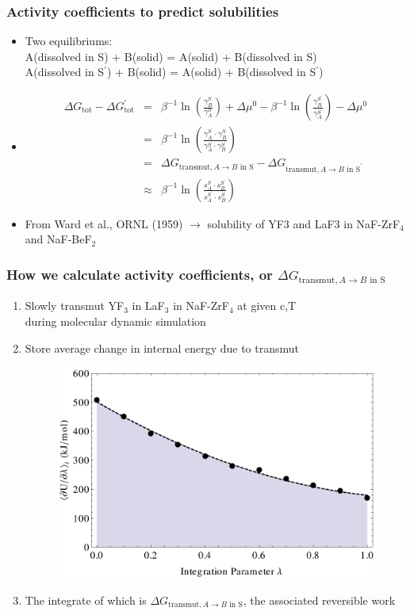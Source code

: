 \documentclass{beamer}
\begin{document}
\begin{frame}
    \frametitle{Activity coefficients to predict solubilities}
    \begin{itemize}
        \item Two equilibriums:\\
            A(dissolved in S) + B(solid) = A(solid) + B(dissolved in S)\\
            A(dissolved in S$^\prime$) + B(solid) = A(solid) + B(dissolved in S$^\prime$)
        \item
            \begin{eqnarray}
                \Delta G_\text{tot} - \Delta G_\text{tot}^\prime &=& \beta^{-1}\ln\left(\frac{\gamma_B^S}{\gamma_A^S}\right) + \Delta \mu ^0  - \beta^{-1}\ln\left(\frac{\gamma_B^{S^\prime}}{\gamma_A^{S^\prime}}\right) - \Delta \mu ^0 \\ \nonumber
                &=& \beta^{-1}\ln\left(\frac{\gamma_A^{S^{\prime}}\cdot\gamma_B^S}{\gamma_A^S\cdot\gamma_B^{S^\prime}}\right) \\ \nonumber
                &=& \Delta G_{\text{transmut},A\rightarrow B\text{ in S}} - \Delta G_{\text{transmut},A\rightarrow B\text{ in S}^{\prime}} \\ \nonumber
                &\approx & \beta^{-1}\ln\left(\frac{s_A^S\cdot s_B^{S^\prime}}{s_A^{S^{\prime}}\cdot s_B^S}\right)   \nonumber
            \end{eqnarray}
        \item From Ward et al., ORNL (1959) $\rightarrow$ solubility of YF3 and LaF3 in NaF-ZrF$_4$ and NaF-BeF$_2$
    \end{itemize}
\end{frame}
\begin{frame}
    \frametitle{How we calculate activity coefficients, or $\Delta G_{\text{transmut},A\rightarrow B\text{ in S}}$}
    \begin{enumerate}
        \item Slowly transmut YF$_3$ in LaF$_3$ in NaF-ZrF$_4$ at given c,T\\ during molecular dynamic simulation
        \item Store average change in internal energy due to transmut
            \begin{figure}
                \includegraphics[width=.6\textwidth]{dudl_of_l}
            \end{figure}
        \item The integrate of which is $\Delta G_{\text{transmut},A\rightarrow B\text{ in S}}$, the associated reversible work
    \end{enumerate}
\end{frame}
\end{document}
